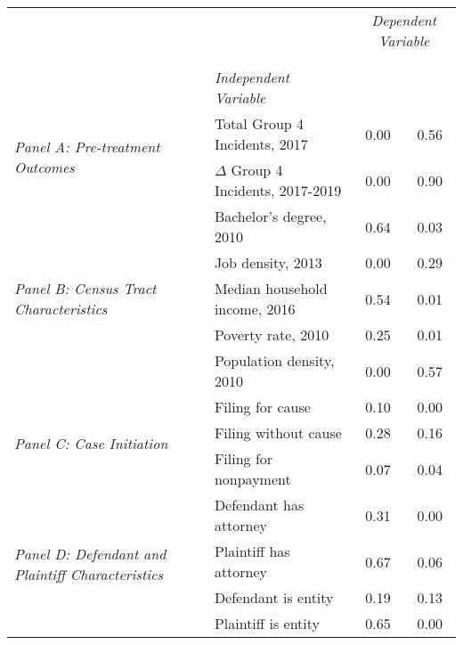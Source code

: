 \begin{tabular}{llcc}
\toprule
 &  & \multicolumn{2}{c}{\textit{Dependent Variable}} \\
\cline{3-4}
\\
 &  &  &  \\
 & \emph{Independent Variable} &  &  \\
\midrule
\multirow[c]{2}{3cm}{\textit{Panel A: Pre-treatment Outcomes}} & Total Group 4 Incidents, 2017 & 0.00 & 0.56 \\
 & $\Delta$ Group 4 Incidents, 2017-2019 & 0.00 & 0.90 \\
\cline{1-4}
\multirow[c]{5}{3cm}{\textit{Panel B: Census Tract Characteristics}} & Bachelor's degree, 2010 & 0.64 & 0.03 \\
 & Job density, 2013 & 0.00 & 0.29 \\
 & Median household income, 2016 & 0.54 & 0.01 \\
 & Poverty rate, 2010 & 0.25 & 0.01 \\
 & Population density, 2010 & 0.00 & 0.57 \\
\cline{1-4}
\multirow[c]{3}{3cm}{\textit{Panel C: Case Initiation}} & Filing for cause & 0.10 & 0.00 \\
 & Filing without cause & 0.28 & 0.16 \\
 & Filing for nonpayment & 0.07 & 0.04 \\
\cline{1-4}
\multirow[c]{4}{3cm}{\textit{Panel D: Defendant and Plaintiff Characteristics}} & Defendant has attorney & 0.31 & 0.00 \\
 & Plaintiff has attorney & 0.67 & 0.06 \\
 & Defendant is entity & 0.19 & 0.13 \\
 & Plaintiff is entity & 0.65 & 0.00 \\
\cline{1-4}
\bottomrule
\end{tabular}
